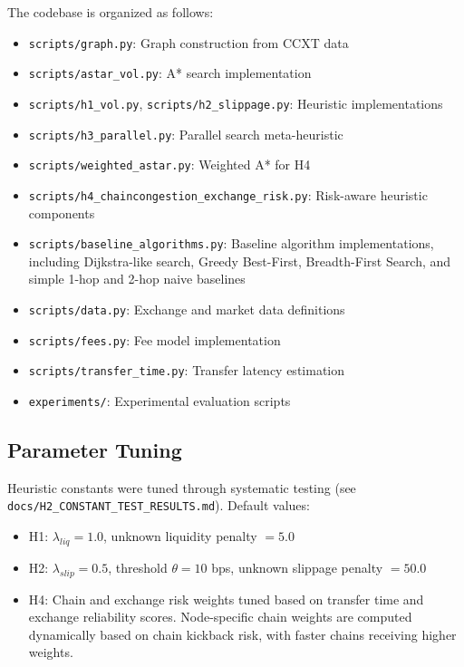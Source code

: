 \documentclass[11pt]{article}
\begin{document}
The codebase is organized as follows:
\begin{itemize}
\item \texttt{scripts/graph.py}: Graph construction from CCXT data
\item \texttt{scripts/astar\_vol.py}: A* search implementation
\item \texttt{scripts/h1\_vol.py}, \texttt{scripts/h2\_slippage.py}: Heuristic implementations
\item \texttt{scripts/h3\_parallel.py}: Parallel search meta-heuristic
\item \texttt{scripts/weighted\_astar.py}: Weighted A* for H4
\item \texttt{scripts/h4\_chaincongestion\_exchange\_risk.py}: Risk-aware heuristic components
\item \texttt{scripts/baseline\_algorithms.py}: Baseline algorithm implementations, including Dijkstra-like search, Greedy Best-First, Breadth-First Search, and simple 1-hop and 2-hop naive baselines
\item \texttt{scripts/data.py}: Exchange and market data definitions
\item \texttt{scripts/fees.py}: Fee model implementation
\item \texttt{scripts/transfer\_time.py}: Transfer latency estimation
\item \texttt{experiments/}: Experimental evaluation scripts
\end{itemize}

\subsection{Parameter Tuning}

Heuristic constants were tuned through systematic testing (see \texttt{docs/H2\_CONSTANT\_TEST\_RESULTS.md}). Default values:
\begin{itemize}
\item H1: $\lambda_{liq} = 1.0$, unknown liquidity penalty $= 5.0$
\item H2: $\lambda_{slip} = 0.5$, threshold $\theta = 10$ bps, unknown slippage penalty $= 50.0$
\item H4: Chain and exchange risk weights tuned based on transfer time and exchange reliability scores. Node-specific chain weights are computed dynamically based on chain kickback risk, with faster chains receiving higher weights.
\end{itemize}



\end{document}
